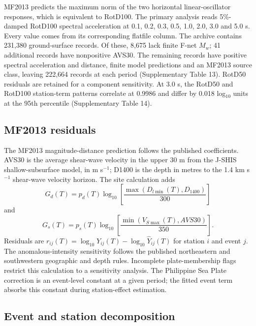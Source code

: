 \documentclass[11pt]{article}
\begin{document}
MF2013 predicts the maximum norm of the two horizontal linear-oscillator responses, which is equivalent to RotD100. The primary analysis reads 5\%-damped RotD100 spectral acceleration at 0.1, 0.2, 0.3, 0.5, 1.0, 2.0, 3.0 and 5.0 s\cite{dohi2024}. Every value comes from its corresponding flatfile column. The archive contains 231,380 ground-surface records. Of these, 8,675 lack finite F-net $M_w$; 41 additional records have nonpositive AVS30. The remaining records have positive spectral acceleration and distance, finite model predictions and an MF2013 source class, leaving 222,664 records at each period (Supplementary Table 13). RotD50 residuals are retained for a component sensitivity. At 3.0 s, the RotD50 and RotD100 station-term patterns correlate at 0.9986 and differ by 0.018 log$_{10}$ units at the 95th percentile (Supplementary Table 14).

\subsection{MF2013 residuals}

The MF2013 magnitude-distance prediction follows the published coefficients\cite{morikawa2013,morikawa2023}. AVS30 is the average shear-wave velocity in the upper 30 m from the J-SHIS shallow-subsurface model, in m s$^{-1}$; D1400 is the depth in metres to the 1.4 km s$^{-1}$ shear-wave velocity horizon. The site calculation adds
\begin{equation}
G_d(T)=p_d(T)\log_{10}\left[\frac{\max(D_{l\min}(T),D_{1400})}{300}\right]
\end{equation}
and
\begin{equation}
G_s(T)=p_s(T)\log_{10}\left[\frac{\min(V_{S\max}(T),AVS30)}{350}\right].
\end{equation}
Residuals are $r_{ij}(T)=\log_{10}Y_{ij}(T)-\log_{10}\widehat{Y}_{ij}(T)$ for station $i$ and event $j$. The anomalous-intensity sensitivity follows the published northeastern and southwestern geographic and depth rules\cite{morikawa2006,morikawa2014}. Incomplete plate-membership flags restrict this calculation to a sensitivity analysis. The Philippine Sea Plate correction is an event-level constant at a given period\cite{morikawa2015}; the fitted event term absorbs this constant during station-effect estimation.

\subsection{Event and station decomposition}
\end{document}
